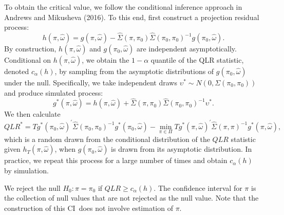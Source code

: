 \documentclass[11pt, letterpaper, twoside, final]{article}
\begin{document}
To obtain the critical value, we follow the conditional inference approach in Andrews and Mikusheva (2016). To
this end, first construct a projection residual process:
%
\begin{equation}
    h(\pi ,\widehat{\omega})=g(\pi ,\widehat{\omega})-\widehat{\Sigma}(\pi ,\pi_{0})\widehat{\Sigma
   }(\pi_{0},\pi_{0})^{-1}g(\pi_{0},\widehat{\omega}).
\end{equation}
%
By construction, $h(\pi ,\widehat{\omega})$ and $g(\pi_{0},\widehat{\omega})$ are independent asymptotically. 
Conditional on $h(\pi ,\widehat{\omega})$, we obtain the $1-\alpha $ quantile of the QLR statistic, denoted
$c_{\alpha}(h)$, by sampling from the asymptotic distributions of $g(\pi_{0},\widehat{\omega})$ under the null.
Specifically, we take independent draws $\upsilon^{\ast}\sim N(0,\Sigma (\pi_{0},\pi_{0}))$ and produce simulated
process:
%
\begin{equation}
    g^{\ast}(\pi ,\widehat{\omega}) = h\left(\pi ,\widehat{\omega}\right) + \widehat{\Sigma} (\pi
    ,\pi_{0})\widehat{\Sigma}(\pi_{0},\pi_{0})^{-1}\upsilon^{\ast}.
\end{equation}%
%
We then calculate
\begin{equation}
    QLR^{\ast}=Tg^{\ast}(\pi_{0},\widehat{\omega})^{\prime}\widehat{\Sigma} (\pi_{0},\pi_{0})^{-1}g^{\ast
   }(\pi_{0},\widehat{\omega})-\underset{\pi \in \Pi}{\min}Tg^{\ast}(\pi ,\widehat{\omega})^{\prime
   }\widehat{\Sigma} (\pi ,\pi )^{-1}g^{\ast}(\pi ,\widehat{\omega}), 
\end{equation}
%
which is a random drawn from the conditional distribution of the $QLR$ statistic given $h_{T}(\pi ,\widehat{\omega
})$, when $g(\pi_{0},\widehat{ \omega})$ is drawn from its asymptotic distribution. 
In practice, we repeat this process for a large number of times and obtain $c_{\alpha}(h)$ by simulation.

We reject the null $H_{0}:\pi =\pi_{0}$ if $QLR\geq c_{\alpha}(h)$. 
The confidence interval for $\pi $ is the collection of null values that are not rejected as the null value. 
Note that the construction of this CI\ does not involve estimation of $\pi$.
\end{document}
